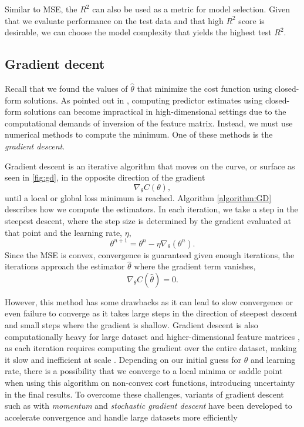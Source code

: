 \documentclass[amssymb,twocolumn,aps]{revtex4}
\begin{document}
Similar to MSE, the $R^2$ can also be used as a metric for model selection. Given that we evaluate performance on the test data and that high $R^2$ score is desirable, we can choose the model complexity that yields the highest test $R^2$.


\subsection{Gradient decent}
\label{sec:gd}

Recall that we found the values of $\hat{\theta}$ that minimize the cost function using closed-form solutions. As pointed out in \cite{fysml3}, computing predictor estimates using closed-form solutions can become impractical in high-dimensional settings due to the computational demands of inversion of the feature matrix. Instead, we must use numerical methods to compute the minimum. One of these methods is the \textit{gradient descent}.

Gradient descent is an iterative algorithm that moves on the curve, or surface as seen in \autoref{fig:gd}, in the opposite direction of the gradient $$\nabla_\theta C(\theta),$$ until a local or global loss minimum is reached. Algorithm \autoref{algorithm:GD} describes how we compute the estimators. In each iteration, we take a step in the steepest descent, where the step size is determined by the gradient evaluated at that point and the learning rate, $\eta$,$$\theta^{n+1} = \theta^n - \eta\nabla_\theta(\theta^n).$$
Since the MSE is convex, convergence is guaranteed given enough iterations, the iterations approach the estimator $\hat{\theta}$ where the gradient  term vanishes, $$\nabla_\theta C(\hat{\theta}) = 0.$$

However, this method has some drawbacks as it can lead to slow convergence or even failure to converge as it takes large steps in the direction of steepest descent and small steps where the gradient is shallow. Gradient descent is also computationally heavy for large dataset and higher-dimensional feature matrices \cite{fysml4}, as each iteration requires computing the gradient over the entire dataset, making it slow and inefficient at scale \cite{rasch1}. Depending on our initial guess for $\theta$ and learning rate, there is a possibility that we converge to a local minima or saddle point when using this algorithm on non-convex cost functions, introducing uncertainty in the final results. To overcome these challenges, variants of gradient descent such as with \textit{momentum} and \textit{stochastic gradient descent} have been developed to accelerate convergence and handle large datasets more efficiently
\end{document}
